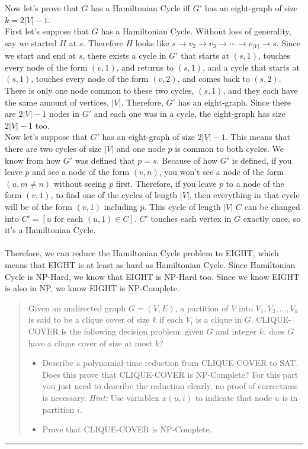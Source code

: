 \documentclass[11pt]{article}
\begin{document}
\begin{solution}
    Now let's prove that $G$ has a Hamiltonian Cycle iff $G'$ has an eight-graph of size $k = 2|V| - 1$.
    \\ First let's suppose that $G$ has a Hamiltonian Cycle. Without loss of generality, say we started $H$ at $s$. Therefore $H$ looks like $s \rightarrow v_2 \rightarrow v_3 \rightarrow \cdots \rightarrow v_{|V|} \rightarrow s$. Since we start and end at $s$, there exists a cycle in $G'$ that starts at $(s, 1)$, touches every node of the form $(v, 1)$, and returns to $(s, 1)$, and a cycle that starts at $(s, 1)$, touches every node of the form $(v, 2)$, and comes back to $(s, 2)$. There is only one node common to these two cycles, $(s, 1)$, and they each have the same amount of vertices, $|V|$. Therefore, $G'$ has an eight-graph. Since there are $2|V| - 1$ nodes in $G'$ and each one was in a cycle, the eight-graph has size $2|V| - 1$ too.
    \\ Now let's suppose that $G'$ has an eight-graph of size $2|V| - 1$. This means that there are two cycles of size $|V|$ and one node $p$ is common to both cycles. We know from how $G'$ was defined that $p = s$. Because of how $G'$ is defined, if you leave $p$ and see a node of the form $(v, n)$, you won't see a node of the form $(u, m \not = n)$ without seeing $p$ first. Therefore, if you leave $p$ to a node of the form $(v, 1)$, to find one of the cycles of length $|V|$, then everything in that cycle will be of the form $(v, 1)$ including $p$. This cycle of length $|V|$ $C$ can be changed into $C' = [u\text{ for each } (u, 1) \in C]$. $C'$ touches each vertex in $G$ exactly once, so it's a Hamiltonian Cycle.
    \\\\ Therefore, we can reduce the Hamiltonian Cycle problem to EIGHT, which means that EIGHT is at least as hard as Hamiltonian Cycle. Since Hamiltonian Cycle is NP-Hard, we know that EIGHT is NP-Hard too. Since we know EIGHT is also in NP, we know EIGHT is NP-Complete.

\end{solution}


\begin{quote}
Given an undirected graph $G=(V,E)$, a partition of $V$
  into $V_1,V_2,\ldots,V_k$ is said to be a clique cover of size $k$
  if each $V_i$ is a clique in $G$. CLIQUE-COVER is the following
  decision problem: given $G$ and integer $k$, does $G$ have a clique
  cover of size at most $k$?
  \begin{itemize}
  \item Describe a polynomial-time reduction from CLIQUE-COVER to
    SAT. Does this prove that CLIQUE-COVER is NP-Complete? For this
    part you just need to describe the reduction clearly, no proof of
    correctness is necessary. {\em Hint:} Use variablex $x(u,i)$ to
    indicate that node $u$ is in partition $i$.
  \item Prove that CLIQUE-COVER is NP-Complete.
  \end{itemize}
\end{quote}
\hrule
\end{document}
